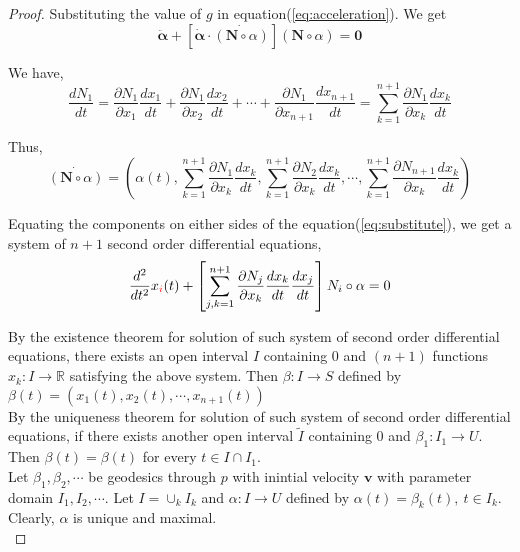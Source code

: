 \begin{proof}
	Substituting the value of $g$ in equation(\ref{eq:acceleration}). We get 
	\begin{equation}
		\ddot{\boldsymbol{\alpha}} + \left[ \dot{\boldsymbol{\alpha}} \cdot \dot{(\mathbf{N} \circ \alpha)}\right] (\mathbf{N} \circ \alpha) = \mathbf{0}
		\label{eq:substitute}
	\end{equation}

	We have,
	\begin{equation}
		\dfrac{dN_1}{dt} = \dfrac{\partial N_1}{\partial x_1} \dfrac{dx_1}{dt} +  \dfrac{\partial N_1}{\partial x_2} \dfrac{dx_2}{dt} + \cdots + \dfrac{\partial N_1}{\partial x_{n+1}} \dfrac{dx_{n+1}}{dt} = \sum_{k=1}^{n+1} \dfrac{\partial N_1}{\partial x_k} \dfrac{dx_k}{dt}
	\end{equation}

	Thus,
	\begin{equation}
		\dot{(\mathbf{N} \circ \alpha)} = \left( \alpha(t), \sum_{k=1}^{n+1} \dfrac{\partial N_1}{\partial x_k} \dfrac{dx_k}{dt}, \sum_{k=1}^{n+1} \dfrac{\partial N_2}{\partial x_k} \dfrac{dx_k}{dt}, \cdots, \sum_{k=1}^{n+1} \dfrac{\partial N_{n+1}}{\partial x_k} \dfrac{dx_k}{dt} \right)
	\end{equation}

	Equating the components on either sides of the equation(\ref{eq:substitute}), we get a system of $n+1$ second order differential equations,
	\begin{equation}
		\dfrac{d^2}{dt^2}x_{\color{red}i}(t) + \left[ \sum_{j,k=1}^{n+1} \dfrac{\partial N_j}{\partial x_k} \dfrac{dx_k}{dt}\dfrac{dx_j}{dt}\right] N_i \circ \alpha = 0
	\end{equation}

	By the existence theorem for solution of such system of second order differential equations, there exists an open interval $I$ containing $0$ and $(n+1)$ functions $x_k : I \to \mathbb{R}$ satisfying the above system. Then $\beta : I \to S$ defined by $\beta(t) = \left( x_1(t),x_2(t),\cdots,x_{n+1}(t) \right)$\\

	By the uniqueness theorem for solution of such system of second order differential equations, if there exists another open interval $\tilde{I}$ containing $0$ and $\beta_1 : I_1 \to U$. Then $\beta(t) = \beta(t)$ for every $t \in I \cap I_1$.\\

	Let $\beta_1,\beta_2,\cdots$ be geodesics through $p$ with inintial velocity $\mathbf{v}$ with parameter domain $I_1,I_2,\cdots$. Let $I = \cup_k I_k$ and $\alpha : I \to U$ defined by $\alpha(t) = \beta_k(t),\ t \in I_k$. Clearly, $\alpha$ is unique and maximal.\\


\end{proof}
